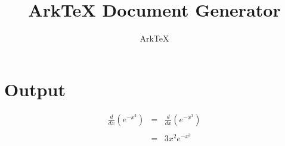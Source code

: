 \documentclass[dvips, 12pt, twoside]{article}
\begin{document}
\title{ArkTeX Document Generator}
\author{ArkTeX}
\maketitle

\medskip

\section*{Output}
\begin{Large}
\begin{eqnarray*}
\frac{d}{dx}(e^{-x^3})&=&\frac{d}{dx}(e^{-x^3})\\
\\
&=&3x^2e^{-x^3}\\
\\
\end{eqnarray*}
\end{Large}
\end{document}
